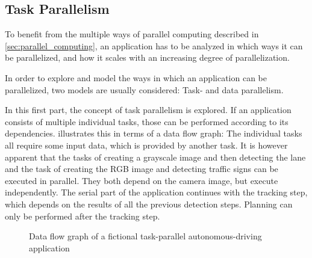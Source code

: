 \documentclass[BCOR20mm,DIV14,10pt,headinclude,footexclude,bibtotoc,liststotoc]{article}
\begin{document}
\subsection{Task Parallelism}
To benefit from the multiple ways of parallel computing described in
\cref{sec:parallel_computing}, an application has to be analyzed in which ways
it can be parallelized, and how it scales with an increasing degree of
parallelization.

In order to explore and model the ways in which an application can be
parallelized, two models are usually considered: Task- and data parallelism.

In this first part, the concept of task parallelism is explored. If an
application consists of multiple individual tasks, those can be performed
according to its dependencies.  illustrates this in terms
of a data flow graph: The individual tasks all require some input data, which is
provided by another task. It is however apparent that the tasks of creating a
grayscale image and then detecting the lane and the task of creating the RGB
image and detecting traffic signs can be executed in parallel. They both depend
on the camera image, but execute independently. The serial part of the
application continues with the tracking step, which depends on the results of
all the previous detection steps. Planning can only be performed after the
tracking step.

\begin{figure}
	\centering
	\caption{Data flow graph of a fictional task-parallel autonomous-driving application}
	\label{fig:task_graph}
\end{figure}
\end{document}
